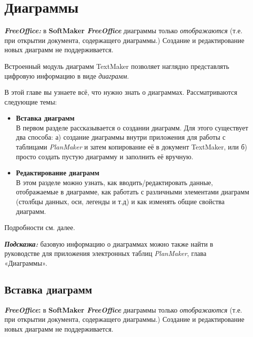 \documentclass[a4paper,10pt]{article}
\begin{document}
 \section{Диаграммы}
 \begin{mdframed}[backgroundcolor=pink!50]
\textbf{\textit{FreeOffice:}} в \textbf{SoftMaker \textit{FreeOffice}} диаграммы только \textit{отображаются} (т.е. при открытии документа, содержащего диаграммы.) Создание и редактирование новых диаграмм не поддерживается.
\end{mdframed}

Встроенный модуль диаграмм TextMaker позволяет наглядно представлять цифровую информацию в виде \textit{диаграмм}.

В этой главе вы узнаете всё, что нужно знать о диаграммах. Рассматриваются следующие темы:

\begin{itemize}
 \item \textbf{Вставка диаграмм}\\
 В первом разделе рассказывается о создании диаграмм. Для этого существует два способа: а) создание диаграммы внутри приложения для работы с таблицами \textit{PlanMaker} и затем копирование её в документ TextMaker, или б) просто создать пустую диаграмму и заполнить её вручную.
 \item \textbf{Редактирование диаграмм}\\
 В этом разделе можно узнать, как вводить/редактировать данные, отображаемые в диаграмме, как работать с различными элементами диаграмм (столбцы данных, оси, легенды и т.д) и как изменять общие свойства диаграмм.
\end{itemize}

Подробности см. далее.

\begin{mdframed}[backgroundcolor=blue!10]
\textbf{\textit{Подсказка:}} базовую информацию о диаграммах можно также найти в руководстве для приложения электронных таблиц \textit{PlanMaker}, глава «Диаграммы».
\end{mdframed}

 \subsection{Вставка диаграмм}
 \begin{mdframed}[backgroundcolor=pink!50]
\textbf{\textit{FreeOffice}:} в \textbf{SoftMaker \textit{FreeOffice}} диаграммы только \textit{отображаются} (т.е. при открытии документа, содержащего диаграммы.) Создание и редактирование новых диаграмм не поддерживается.
\end{mdframed}
\end{document}

